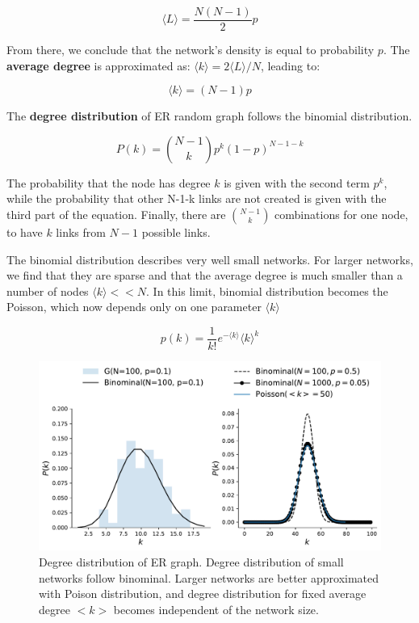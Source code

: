 \begin{equation}
\langle L \rangle = \frac{N(N-1)}{2}p
\end{equation}

From there, we conclude that the network's density is equal to probability $p$.
The \textbf{average degree} is approximated as: $\langle k \rangle = 2 \langle L \rangle / N $, leading to:

\begin{equation}
\langle k \rangle = (N-1)p 
\end{equation}

The \textbf{degree distribution} of ER random graph follows the binomial distribution. 

\begin{equation}
P(k) = \binom{N-1}{k}p^k(1-p)^{N-1-k}
\end{equation}

The probability that the node has degree $k$ is given with the second term $p^k$, while the probability that other N-1-k links are not created is given with the third part of the equation. Finally, there are  $\binom{N-1}{k}$ combinations for one node, to have $k$ links from $N-1$ possible links. 

The binomial distribution describes very well small networks. For larger networks, we find that they are sparse and that the average degree is much smaller than a number of nodes $\langle k \rangle << N$. In this limit, binomial distribution becomes the Poisson, which now depends only on one parameter $\langle k \rangle$

\begin{equation}
p(k) = \frac{1}{k!}e^{-\langle k \rangle}\langle k \rangle^{k}
\end{equation}

\begin{figure}[!ht]
	\centering
	\includegraphics[width=0.9\linewidth]{figures/methodology/ER_dist}
	\caption{Degree distribution of ER graph. Degree distribution of small networks follow binominal. Larger networks are better approximated with Poison distribution, and degree distribution for fixed average degree $<k>$ becomes independent of the network size.}
	\label{fig:erdist}
\end{figure}

